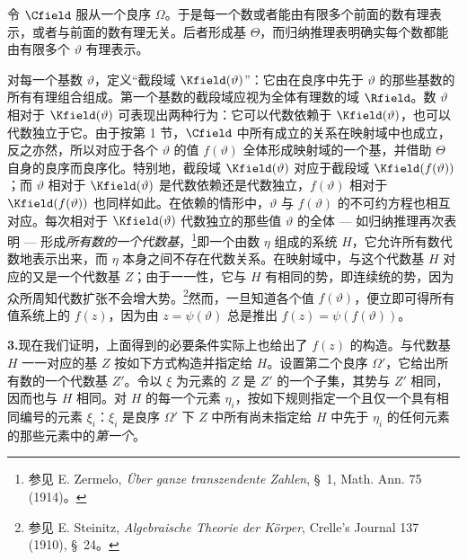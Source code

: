 令 $\Cfield$ 服从一个良序 $\Omega$。于是每一个数或者能由有限多个前面的数有理表示，或者与前面的数有理无关。后者形成基 $\Theta$，而归纳推理表明确实每个数都能由有限多个 $\vartheta$ 有理表示。

对每一个基数 $\vartheta$，定义“截段域 $\Kfield(\vartheta)$”：它由在良序中先于 $\vartheta$ 的那些基数的所有有理组合组成。第一个基数的截段域应视为全体有理数的域 $\Rfield$。数 $\vartheta$ 相对于 $\Kfield(\vartheta)$ 可表现出两种行为：它可以代数依赖于 $\Kfield(\vartheta)$，也可以代数独立于它。由于按第 1 节，$\Cfield$ 中所有成立的关系在映射域中也成立，反之亦然，所以对应于各个 $\vartheta$ 的值 $f(\vartheta)$ 全体形成映射域的一个基，并借助 $\Theta$ 自身的良序而良序化。特别地，截段域 $\Kfield(\vartheta)$ 对应于截段域 $\Kfield(f(\vartheta))$；而 $\vartheta$ 相对于 $\Kfield(\vartheta)$ 是代数依赖还是代数独立，$f(\vartheta)$ 相对于 $\Kfield(f(\vartheta))$ 也同样如此。在依赖的情形中，$\vartheta$ 与 $f(\vartheta)$ 的不可约方程也相互对应。每次相对于 $\Kfield(\vartheta)$ 代数独立的那些值 $\vartheta$ 的全体 --- 如归纳推理再次表明 --- 形成\emph{所有数的一个代数基}，\footnote{参见 E. Zermelo, \emph{Über ganze transzendente Zahlen}, \S\ 1, Math. Ann. 75 (1914)。}即一个由数 $\eta$ 组成的系统 $H$，它允许所有数代数地表示出来，而 $\eta$ 本身之间不存在代数关系。在映射域中，与这个代数基 $H$ 对应的又是一个代数基 $Z$；由于一一性，它与 $H$ 有相同的势，即连续统的势，因为众所周知代数扩张不会增大势。\footnote{参见 E. Steinitz, \emph{Algebraische Theorie der Körper}, Crelle's Journal 137 (1910), \S\ 24。}然而，一旦知道各个值 $f(\vartheta)$，便立即可得所有值系统上的 $f(z)$，因为由 $z=\psi(\vartheta)$ 总是推出 $f(z)=\psi(f(\vartheta))$。

\medskip
\noindent\textbf{3.}\quad 现在我们证明，上面得到的必要条件实际上也给出了 $f(z)$ 的构造。与代数基 $H$ 一一对应的基 $Z$ 按如下方式构造并指定给 $H$。设置第二个良序 $\Omega'$，它给出所有数的一个代数基 $Z'$。令以 $\xi$ 为元素的 $Z$ 是 $Z'$ 的一个子集，其势与 $Z'$ 相同，因而也与 $H$ 相同。对 $H$ 的每一个元素 $\eta_i$，按如下规则指定一个且仅一个具有相同编号的元素 $\xi_i$：$\xi_i$ 是良序 $\Omega'$ 下 $Z$ 中所有尚未指定给 $H$ 中先于 $\eta_i$ 的任何元素的那些元素中的\emph{第一个}。

